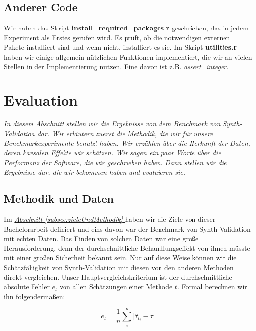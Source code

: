 \documentclass[12pt,a4paper,twoside]{scrartcl}
\numberwithin{equation}{section}
\newcommand{\refsec}[1]{\emph{\hyperref[#1]{Abschnitt \ref*{#1} }}}
\begin{document}
\subsection{Anderer Code}\label{subsec:andererCode}
Wir haben das Skript \textbf{install\_required\_packages.r} geschrieben, das in jedem Experiment als Erstes gerufen wird. Es prüft, ob die notwendigen externen Pakete installiert sind und wenn nicht, installiert es sie. Im Skript \textbf{utilities.r} haben wir einige allgemein nützlichen Funktionen implementiert, die wir an vielen Stellen in der Implementierung nutzen. Eine davon ist z.B. \emph{assert\_integer}.

\clearpage

\section{Evaluation}\label{sec:evaluation}
\noindent
\emph{In diesem Abschnitt stellen wir die Ergebnisse von dem Benchmark von Synth-Validation dar. Wir erläutern zuerst die Methodik, die wir für unsere Benchmarkexperimente benutzt haben. Wir erzählen über die Herkunft der Daten, deren kausalen Effekte wir schätzen. Wir sagen ein paar Worte über die Performanz der Software, die wir geschrieben haben. Dann stellen wir die Ergebnisse dar, die wir bekommen haben und evaluieren sie.}\par

\subsection{Methodik und Daten}\label{subsec:methodikDaten}
Im \refsec{subsec:zieleUndMethodik} haben wir die Ziele von dieser Bachelorarbeit definiert und eins davon war der Benchmark von Synth-Validation mit echten Daten. Das Finden von solchen Daten war eine große Herausforderung, denn der durchschnittliche Behandlungseffekt von ihnen müsste mit einer großen Sicherheit bekannt sein. Nur auf diese Weise können wir die Schätzfähigkeit von Synth-Validation mit diesen von den anderen Methoden direkt vergleichen. Unser Hauptvergleichskriterium ist der durchschnittliche absolute Fehler $e_t$ von allen Schätzungen einer Methode $t$. Formal berechnen wir ihn folgendermaßen:\par

\begin{equation}\label{eq:5.1}
 e_t = \frac{1}{n} \sum_{i}^n \big | \hat{\tau}_{t_i} - \tau \big | 
\end{equation}
\end{document}
